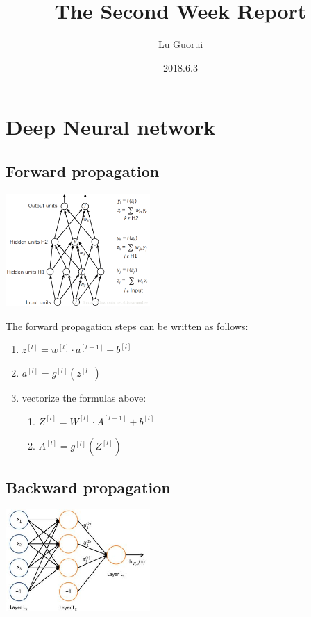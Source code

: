 \documentclass{article}
\title{The Second Week Report}
\author{Lu Guorui}
\date{2018.6.3}
\begin{document}
\maketitle
\tableofcontents

\newpage


\section{Deep Neural network}
\subsection{Forward propagation}

\includegraphics[width=5.5cm]{20171216112534046.png}

The forward propagation steps can be written as follows:
\begin{enumerate}
\item ${z}^{[l]}={w}^{[l]}\cdot{a}^{[l-1]}+{b}^{[l]}$
\item ${{a}^{[l]}}={{g}^{[l]}}\left({{z}^{[l]}}\right)$
\item vectorize the formulas above:
\begin{enumerate}
\item ${Z}^{[l]}={W}^{[l]}\cdot{{A}^{[l-1]}}+{{b}^{[l]}}$
\item ${{A}^{[l]}}={{g}^{[l]}}{({Z}^{[l]})}$
\end{enumerate}
\end{enumerate}

\subsection{Backward propagation}

\includegraphics[width=5.5cm]{backward propagation.jpg}
\end{document}
